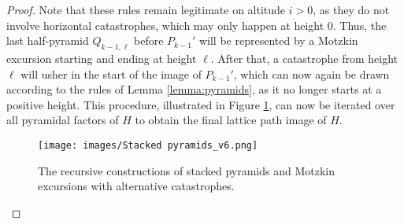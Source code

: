 \begin{proof}
Note that these rules remain legitimate on altitude $i > 0$, as they do not involve horizontal catastrophes, which may only happen at height $0$.
Thus, the last half-pyramid $Q_{k-1,\ell}$ before $P_{k-1}'$ will be represented by a Motzkin excursion starting and ending at height $\ell$. 
After that, a catastrophe from height $\ell$ will usher in the start of the image of $P_{k-1}'$, which can now again be drawn according to the rules of Lemma \ref{lemma:pyramids}, as it no longer starts at a positive height.
This procedure, illustrated in Figure \ref{fig:stacked_pyramids}, can now be iterated over all pyramidal factors of $H$ to obtain the final lattice path image of $H$.

\begin{figure}[hbt!]
  \centering
  \texttt{[image: images/Stacked pyramids\_v6.png]}
  \caption[Recursive construction of stacked pyramids.]{The recursive constructions of stacked pyramids and Motzkin excursions with alternative catastrophes.}
  \label{fig:stacked_pyramids}
\end{figure}


\end{proof}
